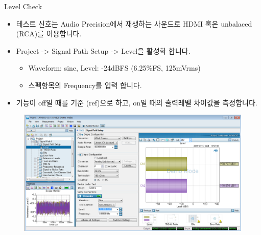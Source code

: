 \documentclass{beamer}
\begin{document}
\begin{frame}[t]{Level Check}
\begin{itemize}
\item 테스트 신호는 Audio Precision에서 재생하는 사운드로 HDMI 혹은 unbalaced (RCA)를 이용합니다.
\item Project -> Signal Path Setup -> Level을 활성화 합니다.
	\begin{itemize}
	\item Waveform: sine, Level: -24dBFS (6.25\%FS, 125mVrms)
	\item 스펙항목의 Frequency를 입력 합니다.
	\end{itemize}
\item 기능이 off일 때를 기준 (ref)으로 하고, on일 때의 출력레벨 차이값을 측정합니다.
\end{itemize}

\begin{figure}[r]
\includegraphics[height=0.4\textwidth]{figure/apsetting/level.png}
\end{figure}

\end{frame}
\end{document}
